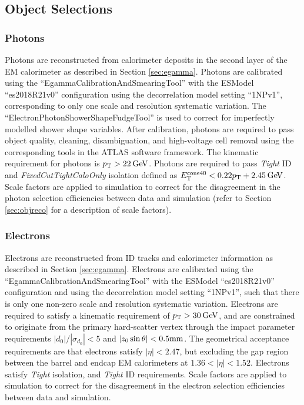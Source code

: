 \subsection{Object Selections}\label{sec:vbswy:objects}

\subsubsection{Photons}

Photons are reconstructed from calorimeter deposits in the second layer of the EM calorimeter as described in Section \ref{sec:egamma}. Photons are calibrated using the ``EgammaCalibrationAndSmearingTool'' with the ESModel ``es2018\tu R21\tu v0'' configuration using the decorrelation model setting ``1NP\tu v1'', corresponding to only one scale and resolution systematic variation. The ``ElectronPhotonShowerShapeFudgeTool'' is used to correct for imperfectly modelled shower shape variables. After calibration, photons are required to pass object quality, cleaning, disambiguation, and high-voltage cell removal using the corresponding tools in the ATLAS software framework. The kinematic requirement for photons is $p_{\text{T}}>22\hspace{2pt}\text{Ge\kern -0.1em V}$. Photons are required to pass \textit{Tight} ID and \textit{FixedCutTightCaloOnly} isolation defined as $E_\text{T}^{\text{cone}40}<0.22p_{\text{T}}+2.45\hspace{2pt}\text{Ge\kern -0.1em V}$. Scale factors are applied to simulation to correct for the disagreement in the photon selection efficiencies between data and simulation (refer to Section \ref{sec:objreco} for a description of scale factors). 

\subsubsection{Electrons}

Electrons are reconstructed from ID tracks and calorimeter information as described in Section \ref{sec:egamma}. Electrons are calibrated using the ``EgammaCalibrationAndSmearingTool'' with the ESModel ``es2018\tu R21\tu v0'' configuration and using the decorrelation model setting ``1NP\tu v1'', such that there is only one non-zero scale and resolution systematic variation. Electrons are required to satisfy a kinematic requirement of $p_{\text{T}}>30\hspace{2pt}\text{Ge\kern -0.1em V}$, and are constrained to originate from the primary hard-scatter vertex through the impact parameter requirements $|d_0|/|\sigma_{d_0}|<5$ and $|z_0\sin\theta|<0.5\text{mm}$. The geometrical acceptance requirements are that electrons satisfy $|\eta|<2.47$, but excluding the gap region between the barrel and endcap EM calorimeters at $1.36<|\eta|<1.52$. Electrons satisfy \textit{Tight} isolation, and \textit{Tight} ID requirements. Scale factors are applied to simulation to correct for the disagreement in the electron selection efficiencies between data and simulation. 

